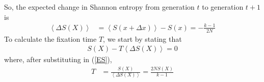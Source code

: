 \documentclass[12pt]{extarticle}
\newcommand{\<}{\langle}
\renewcommand{\>}{\rangle}
\theoremstyle{definition}
\begin{document}
\noindent So, the expected change in Shannon entropy from generation $t$ to generation $t + 1$ is
\begin{align}
    \left< \Delta S(X) \right> &= \left< S(x + \Delta x) \right> - S(x) = -\frac{k - 1}{2N} \label{ES}
\end{align}
To calculate the fixation time $T$, we start by stating that
\begin{align}
    S(X) - T \left< \Delta S(X) \right> = 0 \nonumber
\end{align}
where, after substituting in (\ref{ES}),
\begin{align}
    T &= \frac{S(X)}{\left< \Delta S(X) \right>} = \frac{2NS(X)}{k - 1} \nonumber
\end{align}
\end{document}
